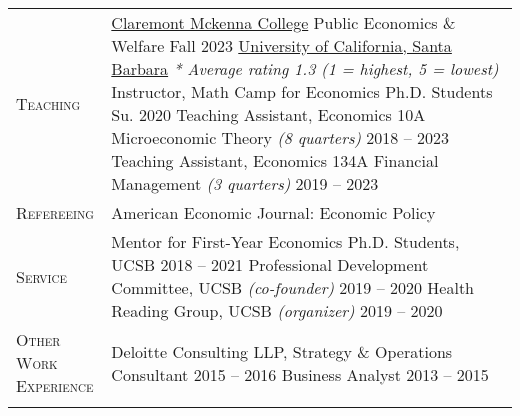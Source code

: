 \documentclass[11pt]{article}
\newcommand{\xspace}{19pt}
\begin{document}
\begin{tabularx}{\textwidth}{@{}Y Z@{}}
	\textsc{Teaching}  & 
	\uline{Claremont Mckenna College}
	\vspace{3pt} \newline
	Public Economics \& Welfare \hfill Fall 2023%
	\vspace{10pt} \newline
	\uline{University of California, Santa Barbara}
	\vspace{3pt} \newline
	\textit{* Average rating 1.3 (1 = highest, 5 = lowest)}
	\vspace{3pt} \newline
	Instructor, Math Camp for Economics Ph.D. Students \hfill Su. 2020%
	\vspace{3pt} \newline
	Teaching Assistant, Economics 10A Microeconomic Theory \textit{(8 quarters)} \hfill 2018 -- 2023%
	\vspace{3pt} \newline
	Teaching Assistant, Economics 134A Financial Management \textit{(3 	quarters)}  \hfill 2019 -- 2023%
	\\ \addlinespace[\xspace] 
	
	\textsc{Refereeing}  & 
	American Economic Journal: Economic Policy
	 \\ \addlinespace[\xspace] 
	
	\textsc{Service} & 
	Mentor for First-Year Economics Ph.D. Students, UCSB \hfill 2018 -- 2021%
	\vspace{3pt} \newline
	Professional Development Committee, UCSB \textit{(co-founder)}  \hfill 2019 -- 2020%
	\vspace{3pt} \newline
	Health Reading Group, UCSB \textit{(organizer)} \hfill 2019 -- 2020%
	\\ \addlinespace[\xspace] 
	

	\textsc{Other Work \newline Experience}  & 
	Deloitte Consulting LLP, Strategy \& Operations
	\vspace{3pt} \newline
	Consultant \hfill 2015 -- 2016%
	\vspace{3pt} \newline
	Business Analyst \hfill 2013 -- 2015%
	\\ \addlinespace[\xspace] 
	

\end{tabularx}
\end{document}
